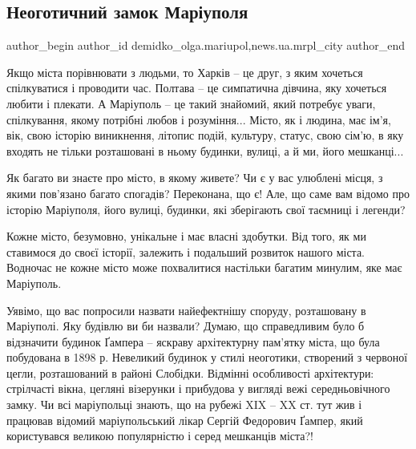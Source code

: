 
 
 
 
 
 
\subsection{Неоготичний замок Маріуполя}
\label{sec:16_08_2017.stz.news.ua.mrpl_city.1.neogotychnyj_zamok_mariupolja}
 
\ifcmt
 author_begin
   author_id demidko_olga.mariupol,news.ua.mrpl_city
 author_end
\fi


Якщо міста порівнювати з людьми, то Харків – це друг, з яким хочеться
спілкуватися і проводити час. Полтава – це симпатична дівчина, яку хочеться
любити і плекати. А Маріуполь – це такий знайомий, який потребує уваги,
спілкування, якому потрібні любов і розуміння... Місто, як і людина, має ім'я,
вік, свою історію виникнення, літопис подій, культуру, статус, свою сім'ю, в
яку входять не тільки розташовані в ньому будинки, вулиці, а й ми, його
мешканці...

Як багато ви знаєте про місто, в якому живете? Чи є у вас улюблені місця, з
якими пов'язано багато спогадів? Переконана, що є! Але, що саме вам відомо про
історію Маріуполя, його вулиці, будинки, які зберігають свої таємниці і
легенди?

Кожне місто, безумовно, унікальне і має власні здобутки. Від того, як  ми
ставимося до своєї історії, залежить і подальший розвиток нашого міста.
Водночас не кожне місто може похвалитися настільки багатим минулим, яке має
Маріуполь.


Уявімо, що вас попросили назвати найефектнішу споруду, розташовану в Маріуполі.
Яку будівлю ви би назвали? Думаю, що справедливим було б відзначити будинок
Ґампера – яскраву архітектурну пам'ятку міста, що була побудована в 1898 р.
Невеликий будинок у стилі неоготики, створений з червоної цегли, розташований в
районі Слобідки. Відмінні особливості архітектури: стрілчасті вікна, цегляні
візерунки і прибудова у вигляді вежі середньовічного замку. Чи всі маріупольці
знають, що на рубежі XIX – XX ст. тут жив і працював відомий маріупольський
лікар Сергій Федорович Ґампер, який користувався великою популярністю і серед
мешканців міста?!


